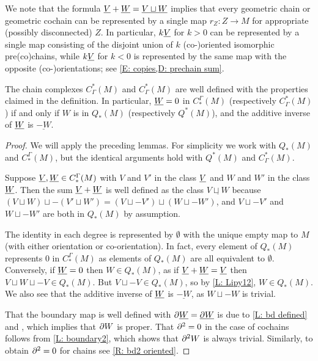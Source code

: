 We note that the formula $\underline{V} + \underline{W} = \underline{V \sqcup W}$ implies that every geometric chain or geometric cochain can be represented by a single map $r_Z \colon Z \to M$ for appropriate (possibly disconnected) $Z$.
In particular, $k \underline{V}$ for $k>0$ can be represented by a single map consisting of the disjoint union of $k$ (co-)oriented isomorphic pre(co)chains, while $k \underline{V}$ for $k<0$ is represented by the same map with the opposite (co-)orientations; see \cref{E: copies,D: prechain sum}.


\begin{lemma}\label{L: co/chains well defined}
	The chain complexes $C_\Gamma^*(M)$ and $C_\Gamma^*(M)$ are well defined with the properties claimed in the definition.
	In particular, $\underline{W} = 0$ in $C^\Gamma_*(M)$ (respectively $C_\Gamma^*(M)$) if and only if $W$ is in $Q_*(M)$ (respectively $Q^*(M)$), and the additive inverse of $\underline{W}$ is $\underline{-W}$.
\end{lemma}

\begin{proof}
	We will apply the preceding lemmas.
	For simplicity we work with $Q_*(M)$ and $C^\Gamma_*(M)$, but the identical arguments hold with $Q^*(M)$ and $C_\Gamma^*(M)$.

	Suppose $\underline{V},\underline{W} \in C^\Gamma_*(M)$ with $V$ and $V'$ in the class $\underline{V}$ and $W$ and $W'$ in the class $\underline{W}$.
	Then the sum $\underline{V}+\underline{W}$ is well defined as the class $\underline{V \sqcup W}$ because $(V \sqcup W) \sqcup -(V' \sqcup W') = (V \sqcup -V') \sqcup (W \sqcup -W')$, and $V \sqcup -V'$ and $W \sqcup -W'$ are both in $Q_*(M)$ by assumption.

	The identity in each degree is represented by $\emptyset$ with the unique empty map to $M$ (with either orientation or co-orientation).
	In fact, every element of $Q_*(M)$ represents $0$ in $C^\Gamma_*(M)$ as elements of $Q_*(M)$ are all equivalent to $\emptyset$.
	Conversely, if $\underline{W} = 0$ then $W \in Q_*(M)$, as if $\underline{V}+\underline{W} = \underline{V}$ then $V \sqcup W \sqcup -V \in Q_*(M)$.
	But $V \sqcup -V \in Q_*(M)$, so by \cref{L: Lipy12}, $W \in Q_*(M)$.
	We also see that the additive inverse of $\underline{W}$ is $\underline{-W}$, as $W \sqcup -W$ is trivial.

	That the boundary map is well defined with $\partial \underline{W} = \underline{\partial W}$ is due to \cref{L: bd defined} and \cite[Lemma 2.8]{Joy12}, which implies that $\partial W$ is proper.
	That $\partial^2 = 0$ in the case of cochains follows from \cref{L: boundary2}, which shows that $\partial^2 W$ is always trivial.
	Similarly, to obtain $\partial^2 = 0$ for chains see \cref{R: bd2 oriented}.
\end{proof}

